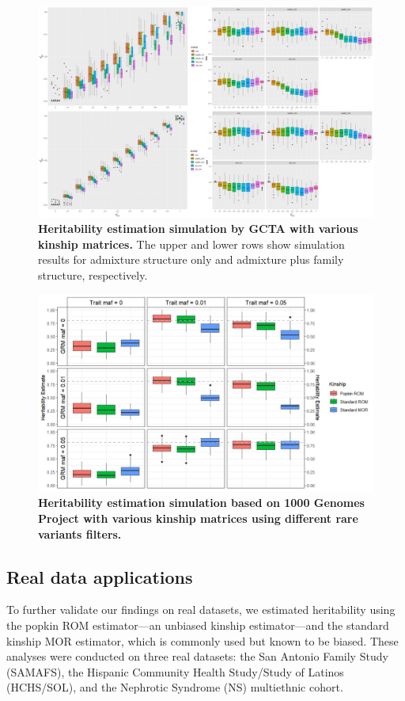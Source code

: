 \documentclass[11pt]{article}
\begin{document}
\begin{figure}[bp!]
  \centering
  \includegraphics[width=\textwidth]{data/Herit_sim_both.png}
  \caption{
    {\bf Heritability estimation simulation by GCTA with various kinship matrices.}
    The upper and lower rows show simulation results for admixture structure only and admixture plus family structure, respectively.
    }
  \label{fig:Herit_sim}
\end{figure}

\begin{figure}[bp!]
  \centering
  \includegraphics[width=\textwidth]{data/tgp_sim.png}
  \caption{
    {\bf Heritability estimation simulation based on 1000 Genomes Project with various kinship matrices using different rare variants filters.}
    }
  \label{fig:tgp_sim}
\end{figure}


\subsection{Real data applications}
To further validate our findings on real datasets, we estimated heritability using the popkin ROM estimator—an unbiased kinship estimator—and the standard kinship MOR estimator, which is commonly used but known to be biased. These analyses were conducted on three real datasets: the San Antonio Family Study (SAMAFS), the Hispanic Community Health Study/Study of Latinos (HCHS/SOL), and the Nephrotic Syndrome (NS) multiethnic cohort.
\end{document}
